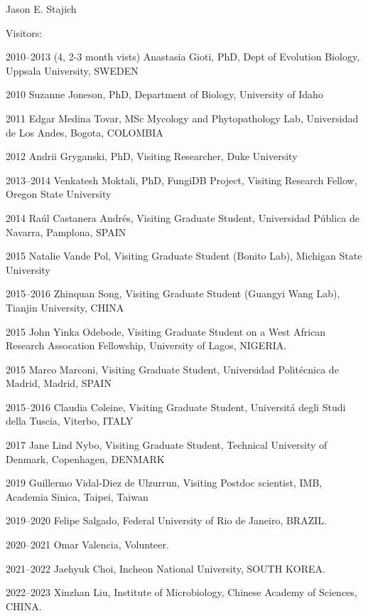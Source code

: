 \documentclass[10pt]{article}
\begin{document}
\begin{cv}{\centerline{Jason E. Stajich}}
\begin{cvlistcompact}{Visitors:}
\item [2010--2013 (4, 2-3 month vists)] Anastasia Gioti, PhD,
  Dept of Evolution Biology, Uppsala University, SWEDEN
\item [2010] Suzanne Joneson, PhD, Department of Biology, University of Idaho
\item [2011] Edgar Medina Tovar, MSc
  Mycology and Phytopathology Lab, Universidad de Los Andes, Bogota, COLOMBIA
\item [2012] Andrii Gryganski, PhD, Visiting Researcher, Duke University
\item [2013--2014] Venkatesh Moktali, PhD,
  FungiDB Project, Visiting Research Fellow, Oregon State University
\item [2014] Ra\'{u}l Castanera Andr\'{e}s, Visiting Graduate Student,
  Universidad P\'{u}blica de Navarra, Pamplona, SPAIN
\item [2015] Natalie Vande Pol, Visiting Graduate Student (Bonito Lab), Michigan State University
\item [2015--2016] Zhinquan Song, Visiting Graduate Student (Guangyi
  Wang Lab), Tianjin University, CHINA
\item [2015] John Yinka Odebode, Visiting Graduate Student on a West
  African Research Assocation Fellowship, University of Lagos, NIGERIA.
\item [2015] Marco Marconi, Visiting Graduate Student,
    Universidad Polit\'{e}cnica de Madrid, Madrid, SPAIN
\item [2015--2016] Claudia Coleine, Visiting Graduate Student,
    Universit\'{a} degli Studi della Tuscia, Viterbo, ITALY
\item [2017] Jane Lind Nybo, Visiting Graduate Student,
Technical University of Denmark, Copenhagen, DENMARK
\item [2019] Guillermo Vidal-Diez de Ulzurrun, Visiting Postdoc scientist,
IMB, Academia Sinica, Taipei, Taiwan
\item [2019--2020] Felipe Salgado, Federal University of Rio de Janeiro, BRAZIL.
\item [2020--2021] Omar Valencia, Volunteer.
\item [2021--2022] Jaehyuk Choi, Incheon National University, SOUTH KOREA.
\item [2022--2023] Xinzhan Liu, Institute of Microbiology, Chinese Academy of Sciences, CHINA.
\end{cvlistcompact}


\end{cv}
\end{document}

